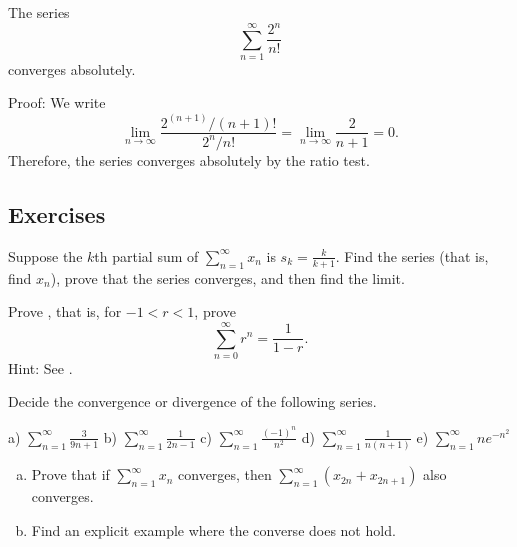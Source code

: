 \begin{example}
The series
\begin{equation*}
\sum_{n=1}^\infty \frac{2^n}{n!}
\end{equation*}
converges absolutely.

Proof:  We write
\begin{equation*}
\lim_{n\to\infty} \frac{2^{(n+1)}/(n+1)!}{2^n / n!} =
\lim_{n\to\infty} \frac{2}{n+1} = 0 .
\end{equation*}
Therefore, the series converges absolutely by the ratio test.
\end{example}

\subsection{Exercises}

\begin{exercise}
Suppose the $k$th partial sum of $\displaystyle \sum_{n=1}^\infty x_n$ is $s_k = \frac{k}{k+1}$.
Find the series (that is, find $x_n$), prove that the series converges, and
then find the limit.
\end{exercise}

\begin{exercise} \label{geometric:exr}
Prove , that is, for $-1 < r < 1$, prove
\begin{equation*}
\sum_{n=0}^\infty r^n = \frac{1}{1-r} .
\end{equation*}
Hint:  See .
\end{exercise}

\begin{exercise}
Decide the convergence or divergence of the following series.

\medskip

\noindent
a)
$\displaystyle \sum_{n=1}^\infty \frac{3}{9n+1}$
\qquad
b)
$\displaystyle \sum_{n=1}^\infty \frac{1}{2n-1}$
\qquad
c)
$\displaystyle \sum_{n=1}^\infty \frac{{(-1)}^n}{n^2}$
\qquad
d)
$\displaystyle \sum_{n=1}^\infty \frac{1}{n(n+1)}$
\qquad
e)
$\displaystyle \sum_{n=1}^\infty n e^{-n^2}$
\end{exercise}

\begin{samepage}
\begin{exercise}
\leavevmode
\begin{enumerate}[a)]
\item Prove that if
$\displaystyle
\sum_{n=1}^\infty x_n
$
converges, then
$\displaystyle
\sum_{n=1}^\infty ( x_{2n} + x_{2n+1} )
$
also converges.
\item
Find an explicit example where the converse does not hold.
\end{enumerate}
\end{exercise}
\end{samepage}

